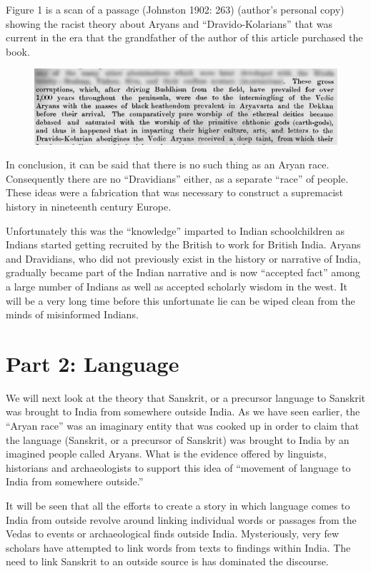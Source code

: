 Figure 1 is a scan of a passage (Johnston 1902: 263) (author’s personal copy) showing the racist theory about Aryans and “Dravido-Kolarians” that was current in the era that the grandfather of the author of this article purchased the book.

\begin{figure}[!htbp]
\includegraphics[scale=0.35]{images/7-01.jpg}
\caption{}\label{art7-fig01}
\end{figure}

In conclusion, it can be said that there is no such thing as an Aryan race. Consequently there are no “Dravidians” either, as a separate “race” of people. These ideas were a fabrication that was necessary to construct a supremacist history in nineteenth century Europe.

Unfortunately this was the “knowledge” imparted to Indian schoolchildren as Indians started getting recruited by the British to work for British India. Aryans and Dravidians, who did not previously exist in the history or narrative of India, gradually became part of the Indian narrative and is now “accepted fact” among a large number of Indians as well as accepted scholarly wisdom in the west. It will be a very long time before this unfortunate lie can be wiped clean from the minds of misinformed Indians.


\section*{Part 2: Language}

We will next look at the theory that Sanskrit, or a precursor language to Sanskrit was brought to India from somewhere outside India. As we have seen earlier, the “Aryan race” was an imaginary entity that was cooked up in order to claim that the language (Sanskrit, or a precursor of Sanskrit) was brought to India by an imagined people called Aryans. What is the evidence offered by linguists, historians and archaeologists to support this idea of “movement of language to India from somewhere outside.”

It will be seen that all the efforts to create a story in which language comes to India from outside revolve around linking individual words or passages from the Vedas to events or archaeological finds outside India. Mysteriously, very few scholars have attempted to link words from texts to findings within India. The need to link Sanskrit to an outside source is has dominated the discourse.

